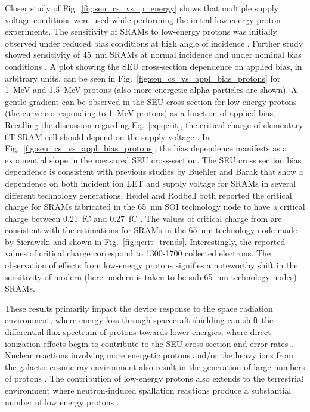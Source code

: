 Closer study of Fig.~\ref{fig:seu_cs_vs_p_energy} shows that multiple supply voltage conditions were used while performing the initial low-energy proton experiments.
The sensitivity of SRAMs to low-energy protons was initially observed under reduced bias conditions at high angle of incidence \cite{Heidel:2006tp}.
Further study showed sensitivity of 45~nm SRAMs at normal incidence and under nominal bias conditions \cite{Rodbell:2007vl,Heidel:2009vx}.
A plot showing the SEU cross-section dependence on applied bias, in arbitrary units, can be seen in Fig.~\ref{fig:seu_cs_vs_appl_bias_protons} for 1~MeV and 1.5~MeV protons (also more energetic alpha particles are shown).
A gentle gradient can be observed in the SEU cross-section for low-energy protons (the curve corresponding to 1~MeV protons) as a function of applied bias.
Recalling the discussion regarding Eq.~\ref{eq:qcrit}, the critical charge of elementary 6T-SRAM cell should depend on the supply voltage \cite{buehler1990alpha,roth1993monitoring,barak1999scaling}.
In Fig.~\ref{fig:seu_cs_vs_appl_bias_protons}, the bias dependence manifests as a exponential slope in the measured SEU cross-section.
The SEU cross section bias dependence is consistent with previous studies by Buehler \cite{buehler1990alpha} and Barak \cite{barak1999scaling,barak2004use} that show a dependence on both incident ion LET and supply voltage for SRAMs in several different technology generations.
Heidel and Rodbell both reported the critical charge for SRAMs fabricated in the 65~nm SOI technology node to have a critical charge between 0.21~fC and 0.27~fC \cite{Heidel:2006tp,Rodbell:2007vl}.
The values of critical charge from \cite{Heidel:2006tp,Rodbell:2007vl} are consistent with the estimations for SRAMs in the 65~nm technology node made by Sierawski and shown in Fig.~\ref{fig:qcrit_trends}.
Interestingly, the reported values of critical charge correspond to 1300-1700 collected electrons.
The observation of effects from low-energy protons signifies a noteworthy shift in the sensitivity of modern (here modern is taken to be sub-65~nm technology nodes) SRAMs.

These results primarily impact the device response to the space radiation environment, where energy loss through spacecraft shielding can shift the differential flux spectrum of protons towards lower energies, where direct ionization effects begin to contribute to the SEU cross-section and error rates \cite{Sierawski:2009ka}.
Nuclear reactions involving more energetic protons and/or the heavy ions from the galactic cosmic ray environment also result in the generation of large numbers of protons \cite{Rodbell:2007vl}.
The contribution of low-energy protons also extends to the terrestrial environment where neutron-induced spallation reactions produce a substantial number of low energy protons \cite{Rodbell:2007vl}.

